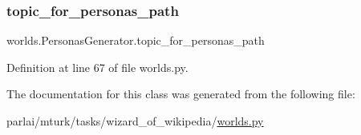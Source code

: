 \subsubsection{\texorpdfstring{topic\+\_\+for\+\_\+personas\+\_\+path}{topic\_for\_personas\_path}}
{\footnotesize\ttfamily worlds.\+Personas\+Generator.\+topic\+\_\+for\+\_\+personas\+\_\+path}



Definition at line 67 of file worlds.\+py.



The documentation for this class was generated from the following file\+:\begin{DoxyCompactItemize}
\item 
parlai/mturk/tasks/wizard\+\_\+of\+\_\+wikipedia/\hyperlink{parlai_2mturk_2tasks_2wizard__of__wikipedia_2worlds_8py}{worlds.\+py}\end{DoxyCompactItemize}
